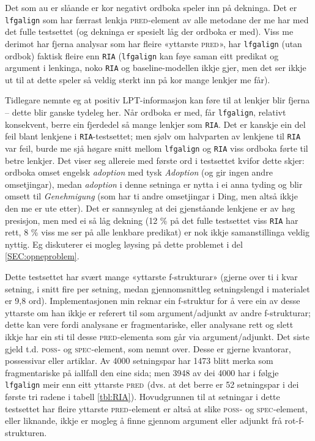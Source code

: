 \documentclass[12pt,a4paper,oneside,draft]{report}
\newcommand{\F}[2]{\textsc{#1}\ensuremath{_{#2}}}
\newcommand{\SPEC}{\F{spec}{}}
\newcommand{\POSS}{\F{poss}{}}
\newcommand{\PRED}{\F{pred}{}}
\begin{document}
Det som au er slåande er kor negativt ordboka speler inn på dekninga.
 Det er \texttt{lfgalign} som har færrast lenkja \PRED{}-element av alle
 metodane der me har med det fulle testsettet (og dekninga er spesielt
 låg der ordboka er med). Viss me derimot har fjerna analysar som har
 fleire «yttarste \PRED{}», har \texttt{lfgalign} (utan ordbok) faktisk
 fleire enn \texttt{RIA} (\texttt{lfgalign} kan føye saman eitt predikat og argument
 i lenkinga, noko \texttt{RIA} og baseline-modellen ikkje gjer, men det ser
 ikkje ut til at dette speler så veldig sterkt inn på kor mange
 lenkjer me får).

Tidlegare nemnte eg at positiv LPT\hyp{}informasjon kan føre til at lenkjer
 blir fjerna -- dette blir ganske tydeleg her. Når ordboka er med, får
 \texttt{lfgalign}, relativt konsekvent, berre ein fjerdedel så mange lenkjer
 som \texttt{RIA}.  Det er kanskje ein del feil blant lenkjene i
 \texttt{RIA}-testsettet; men sjølv om halvparten av lenkjene til \texttt{RIA} var
 feil, burde me sjå høgare snitt mellom \texttt{lfgalign} og \texttt{RIA} viss
 ordboka førte til betre lenkjer. Det viser seg allereie med første
 ord i testsettet kvifor dette skjer: ordboka omset engelsk \emph{adoption}
 med tysk \emph{Adoption} (og gir ingen andre omsetjingar), medan
 \emph{adoption} i denne setninga er nytta i ei anna tyding og blir omsett
 til \emph{Genehmigung} (som har ti andre omsetjingar i Ding, men altså
 ikkje den me er ute etter).  Det er sannsynleg at dei gjenståande
 lenkjene er av høg presisjon, men med ei så låg dekning (12 \% på det
 fulle testsettet viss \texttt{RIA} har rett, 8 \% viss me ser på alle
 lenkbare predikat) er nok ikkje samanstillinga veldig nyttig. Eg
 diskuterer ei mogleg løysing på dette problemet i del
 \ref{SEC:opneproblem}.

Dette testsettet har svært mange «yttarste f\hyp{}strukturar» (gjerne over
 ti i kvar setning, i snitt fire per setning, medan gjennomsnittleg
 setningslengd i materialet er 9,8 ord). Implementasjonen min reknar
 ein f\hyp{}struktur for å vere ein av desse yttarste om han ikkje er
 referert til som argument/adjunkt av andre f\hyp{}strukturar; dette kan
 vere fordi analysane er fragmentariske, eller analysane rett og slett
 ikkje har ein sti til desse \PRED{}-elementa som går via
 argument/adjunkt. Det siste gjeld t.d.  \POSS{}- og \SPEC{}-element,
 som nemnt over. Desse er gjerne kvantorar, possessivar eller
 artiklar. Av 4000 setningspar har 1473 blitt merka som fragmentariske
 på iallfall den eine sida; men 3948 av dei 4000 har i følgje
 \texttt{lfgalign} meir enn eitt yttarste \PRED{} (dvs. at det berre er 52
 setningspar i dei første tri radene i tabell
 \ref{tbl:RIA}). Hovudgrunnen til at setningar i dette testsettet har
 fleire yttarste \PRED{}-element er altså at slike \POSS{}- og
 \SPEC{}-element, eller liknande, ikkje er mogleg å finne gjennom
 argument eller adjunkt frå rot-f\hyp{}strukturen.
\end{document}
